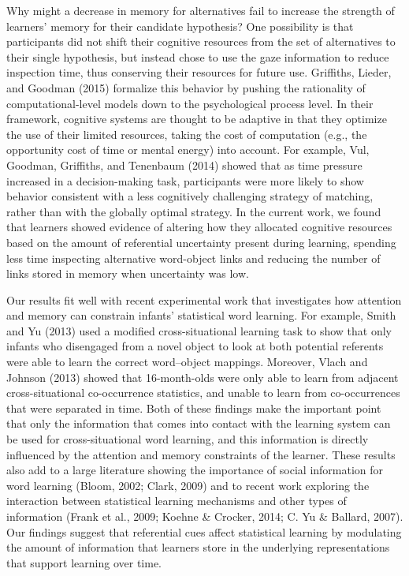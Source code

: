 \documentclass[oneside]{report}
\begin{document}
Why might a decrease in memory for alternatives fail to increase the
strength of learners' memory for their candidate hypothesis? One
possibility is that participants did not shift their cognitive resources
from the set of alternatives to their single hypothesis, but instead
chose to use the gaze information to reduce inspection time, thus
conserving their resources for future use. Griffiths, Lieder, and
Goodman (2015) formalize this behavior by pushing the rationality of
computational-level models down to the psychological process level. In
their framework, cognitive systems are thought to be adaptive in that
they optimize the use of their limited resources, taking the cost of
computation (e.g., the opportunity cost of time or mental energy) into
account. For example, Vul, Goodman, Griffiths, and Tenenbaum (2014)
showed that as time pressure increased in a decision-making task,
participants were more likely to show behavior consistent with a less
cognitively challenging strategy of matching, rather than with the
globally optimal strategy. In the current work, we found that learners
showed evidence of altering how they allocated cognitive resources based
on the amount of referential uncertainty present during learning,
spending less time inspecting alternative word-object links and reducing
the number of links stored in memory when uncertainty was low.

Our results fit well with recent experimental work that investigates how
attention and memory can constrain infants' statistical word learning.
For example, Smith and Yu (2013) used a modified cross-situational
learning task to show that only infants who disengaged from a novel
object to look at both potential referents were able to learn the
correct word--object mappings. Moreover, Vlach and Johnson (2013) showed
that 16-month-olds were only able to learn from adjacent
cross-situational co-occurrence statistics, and unable to learn from
co-occurrences that were separated in time. Both of these findings make
the important point that only the information that comes into contact
with the learning system can be used for cross-situational word
learning, and this information is directly influenced by the attention
and memory constraints of the learner. These results also add to a large
literature showing the importance of social information for word
learning (Bloom, 2002; Clark, 2009) and to recent work exploring the
interaction between statistical learning mechanisms and other types of
information (Frank et al., 2009; Koehne \& Crocker, 2014; C. Yu \&
Ballard, 2007). Our findings suggest that referential cues affect
statistical learning by modulating the amount of information that
learners store in the underlying representations that support learning
over time.
\end{document}
